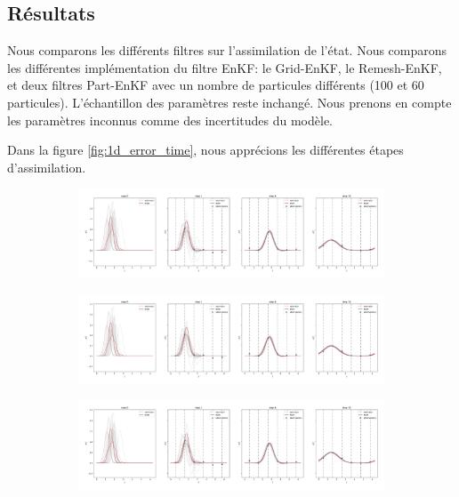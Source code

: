 \subsection{Résultats}

Nous comparons les différents filtres sur l'assimilation de l'état. Nous comparons les différentes implémentation du filtre EnKF: le Grid-EnKF, le Remesh-EnKF, et deux filtres Part-EnKF avec un nombre de particules différents (100 et 60 particules). L'échantillon des paramètres reste inchangé. Nous prenons en compte les paramètres inconnus comme des incertitudes du modèle.

Dans la figure \ref{fig:1d_error_time}, nous apprécions les différentes étapes d'assimilation.

\begin{figure}
    \centering
    \begin{subfigure}{\textwidth}
        \includegraphics[width=\textwidth]{images/app1d/wo_calibration/grid_euler.png}
    \end{subfigure}
    \begin{subfigure}{\textwidth}
        \includegraphics[width=\textwidth]{images/app1d/wo_calibration/remesh_EnKF.png}
    \end{subfigure}
    \begin{subfigure}{\textwidth}
        \includegraphics[width=\textwidth]{images/app1d/wo_calibration/part_enkf_30.png}

\end{subfigure}
\end{figure}
